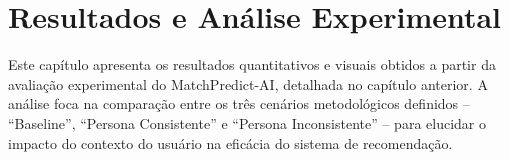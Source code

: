 
\chapter{Resultados e Análise Experimental}
\label{chap:resultados}

Este capítulo apresenta os resultados quantitativos e visuais obtidos a partir da avaliação experimental do MatchPredict-AI, detalhada no capítulo anterior. A análise foca na comparação entre os três cenários metodológicos definidos -- ``Baseline'', ``Persona Consistente'' e ``Persona Inconsistente'' -- para elucidar o impacto do contexto do usuário na eficácia do sistema de recomendação.



